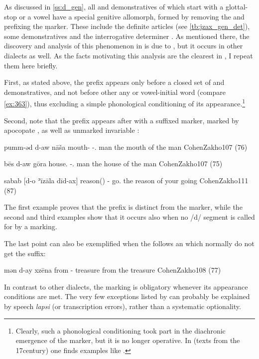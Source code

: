As discussed in \ref{ss:d_gen}, all  and demonstratives of \JZax which  start with  a glottal-stop or a vowel have a special genitive allomorph, formed by removing the  and prefixing the \gen* \d marker.
These include the definite articles (see \vref{tb:jzax_gen_det}), some demonstratives and the interrogative determiner . As mentioned there, the discovery and analysis of this phenomenon in \JZax is due to \citet{CohenNucleus}, but it occurs in other dialects as well.  As the  facts motivating this analysis are the clearest in \JZax,  I repeat them here briefly.

First, as stated above, the \d prefix appears only before a closed set of  and demonstratives, and not before other any  or vowel-initial word (compare \vref{ex:363}), thus excluding a simple phonological conditioning of its appearance.\footnote{Clearly, such a phonological conditioning took part in the diachronic emergence of the marker, but it is no longer operative. In \Nrt (texts from the 17\th century) one finds examples like  \citep[38, §2]{SabarDictionary}.} 

Second, note that the \d prefix appears after \prims with a suffixed \cst* marker, \prims marked by apocopate \cst*, as well as unmarked invariable \prims:

{pumm-əd d-aw nāša}
{mouth-\cst{} \gen-.\masc{} man}
{the mouth of the man}
{CohenZakho}{107 (76)}

{bēs d-aw gōra}
{house.\cst{} \gen-.\masc{} man}
{the house of the man}
{CohenZakho}{107 (75)}

{sabab [d-o ʾīzāla dīd-ax]}
{reason(\invar) \gen- go.\inf{} \fem}
{the reason of your going}
{CohenZakho}{111 (87)}


The first example proves that the \d prefix is distinct from the \cst* marker, while the second and third examples show that it occurs also when no \ph/d/ segment is called for by a \cst* marking. 

The last point can also be exemplified when the  follows an  which normally do not get the  suffix:

{mən d-ay xzēna}
{from \gen- treasure}
{from the treasure}
{CohenZakho}{108 (77)}

In contrast to other dialects, the \gen* marking is obligatory whenever its appearance conditions are met. The very few exceptions listed by \citet[108, fn. 15]{CohenZakho} can probably be explained by speech \textit{lapsi} (or transcription errors), rather than a systematic optionality.  

